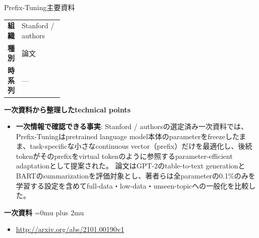 \begin{technicalnote}{Prefix-Tuning}{主要資料}
\begingroup
\begin{tabularx}{\linewidth}{@{}>{\bfseries}p{0.22\linewidth}X@{}}
組織 & Stanford / authors \\
種別 & 論文 \\
時系列 & — \\
\end{tabularx}
\smallskip
{\bfseries 一次資料から整理したtechnical points}
\begin{itemize}[leftmargin=1.5em,itemsep=0.35em]
\item \textbf{一次情報で確認できる事実}: Stanford / authorsの選定済み一次資料では、Prefix-Tuningはpretrained language model本体のparameterをfreezeしたまま、task-specificな小さなcontinuous vector（prefix）だけを最適化し、後続tokenがそのprefixをvirtual tokenのように参照するparameter-efficient adaptationとして提案された。 論文はGPT-2のtable-to-text generationとBARTのsummarizationを評価対象とし、著者らは全parameterの0.1\%のみを学習する設定を含めてfull-data・low-data・unseen-topicへの一般化を比較した。
\end{itemize}
\begin{minipage}{\linewidth}
\begin{samepage}
{\bfseries 一次資料}
\begingroup\sloppy
\Urlmuskip=0mu plus 2mu\relax
\begin{itemize}[leftmargin=1.5em,itemsep=0.25em]
\item {\scriptsize\url{http://arxiv.org/abs/2101.00190v1}}
\end{itemize}
\endgroup
\end{samepage}
\end{minipage}
\endgroup
\end{technicalnote}
\medskip

